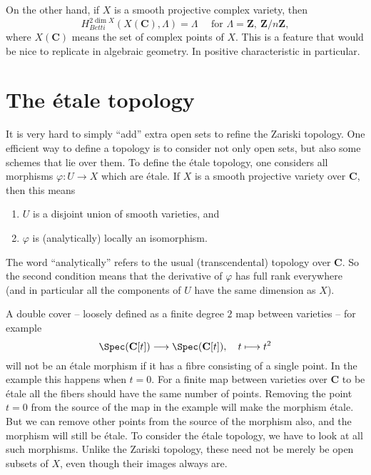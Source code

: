 \medskip\noindent
On the other hand, if $X$ is a smooth projective complex variety, then
$$
H_{Betti}^{2 \dim X}(X (\mathbf{C}), \Lambda) = \Lambda \quad \text{ for }
\Lambda = \mathbf{Z}, \ \mathbf{Z}/n\mathbf{Z},
$$
where $X(\mathbf{C})$ means the set of complex points of $X$. This is a feature
that would be nice to replicate in algebraic geometry. In positive
characteristic in particular.




\section{The \'etale topology}
\label{section-etale-topology}

\noindent
It is very hard to simply ``add'' extra open sets to refine the Zariski
topology. One efficient way to define a topology is to consider not only open
sets, but also some schemes that lie over them. To define the \'etale topology,
one considers all morphisms $\varphi : U \to X$ which are \'etale. If
$X$ is a smooth projective variety over $\mathbf{C}$, then this means
\begin{enumerate}
\item $U$ is a disjoint union of smooth varieties, and
\item $\varphi$ is (analytically) locally an isomorphism.
\end{enumerate}
The word ``analytically'' refers to the usual (transcendental) topology over
$\mathbf{C}$. So the second condition means that the derivative of $\varphi$
has full rank everywhere (and in particular all the components of $U$
have the same dimension as $X$).

\medskip\noindent
A double cover -- loosely defined as a finite degree $2$ map between varieties
-- for example
$$
\Spec(\mathbf{C}[t])
\longrightarrow
\Spec(\mathbf{C}[t]),
\quad t \longmapsto t^2
$$
will not be an \'etale morphism if it has a fibre consisting of a single point.
In the example this happens when $t = 0$. For a finite map between varieties
over $\mathbf{C}$ to be \'etale all the fibers should have the same number of
points. Removing the point $t = 0$ from the source of the map in the example
will make the morphism \'etale. But we can remove other points from the source
of the morphism also, and the morphism will still be \'etale.  To consider the
\'etale topology, we have to look at all such morphisms. Unlike the Zariski
topology, these need not be merely be open subsets of $X$, even though their
images always are.

